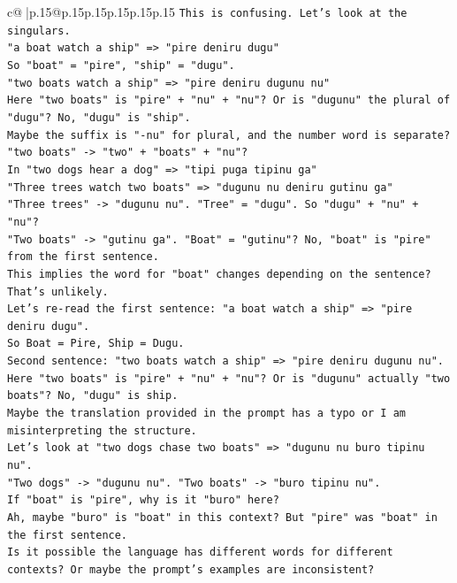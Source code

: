 \documentclass{article}
\begin{document}
{\begin{supertabular}{c@{$\;$}|p{.15\linewidth}@{}p{.15\linewidth}p{.15\linewidth}p{.15\linewidth}p{.15\linewidth}p{.15\linewidth}}
{{{\texttt{This is confusing. Let's look at the singulars.} \\
\texttt{"a boat watch a ship" => "pire deniru dugu"} \\
\texttt{So "boat" = "pire", "ship" = "dugu".} \\
\texttt{"two boats watch a ship" => "pire deniru dugunu nu"} \\
\texttt{Here "two boats" is "pire" + "nu" + "nu"? Or is "dugunu" the plural of "dugu"? No, "dugu" is "ship".} \\
\texttt{Maybe the suffix is "{-}nu" for plural, and the number word is separate?} \\
\texttt{"two boats" {-}> "two" + "boats" + "nu"?} \\
\texttt{In "two dogs hear a dog" => "tipi puga tipinu ga"} \\
\texttt{"Three trees watch two boats" => "dugunu nu deniru gutinu ga"} \\
\texttt{"Three trees" {-}> "dugunu nu". "Tree" = "dugu". So "dugu" + "nu" + "nu"?} \\
\texttt{"Two boats" {-}> "gutinu ga". "Boat" = "gutinu"? No, "boat" is "pire" from the first sentence.} \\
\texttt{This implies the word for "boat" changes depending on the sentence? That's unlikely.} \\
\texttt{Let's re{-}read the first sentence: "a boat watch a ship" => "pire deniru dugu".} \\
\texttt{So Boat = Pire, Ship = Dugu.} \\
\texttt{Second sentence: "two boats watch a ship" => "pire deniru dugunu nu".} \\
\texttt{Here "two boats" is "pire" + "nu" + "nu"? Or is "dugunu" actually "two boats"? No, "dugu" is ship.} \\
\texttt{Maybe the translation provided in the prompt has a typo or I am misinterpreting the structure.} \\
\texttt{Let's look at "two dogs chase two boats" => "dugunu nu buro tipinu nu".} \\
\texttt{"Two dogs" {-}> "dugunu nu". "Two boats" {-}> "buro tipinu nu".} \\
\texttt{If "boat" is "pire", why is it "buro" here?} \\
\texttt{Ah, maybe "buro" is "boat" in this context? But "pire" was "boat" in the first sentence.} \\
\texttt{Is it possible the language has different words for different contexts? Or maybe the prompt's examples are inconsistent?} \\
}}}
\end{supertabular}}
\end{document}
